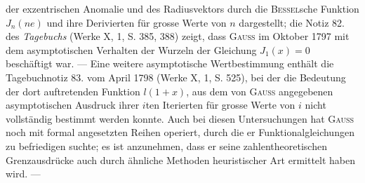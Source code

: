 der exzentrischen Anomalie und des Radiusvektors durch die \textsc{Bessel}sche
Funktion \(J_n(ne)\) und ihre Derivierten für grosse Werte von \(n\) dargestellt;
die Notiz 82. des \textit{Tagebuchs} (Werke X, 1, S. 385, 388) zeigt, dass \textsc{Gauss} im
Oktober 1797 mit dem asymptotischen Verhalten der Wurzeln der Gleichung
\(J_1(x)=0\) beschäftigt war. — Eine weitere asymptotische Wertbestimmung
enthält die Tagebuchnotiz 83. vom April 1798 (Werke X, 1, S. 525), bei der
die Bedeutung der dort auftretenden Funktion \(l(1+x)\), aus dem von \textsc{Gauss}
angegebenen asymptotischen Ausdruck ihrer \(i\)ten Iterierten für grosse Werte
von \(i\) nicht vollständig bestimmt werden konnte. Auch bei diesen Untersuchungen
hat \textsc{Gauss} noch mit formal angesetzten Reihen operiert, durch die
er Funktionalgleichungen zu befriedigen suchte; es ist anzunehmen, dass er
seine zahlentheoretischen Grenzausdrücke auch durch ähnliche Methoden heuristischer
Art ermittelt haben wird. —

